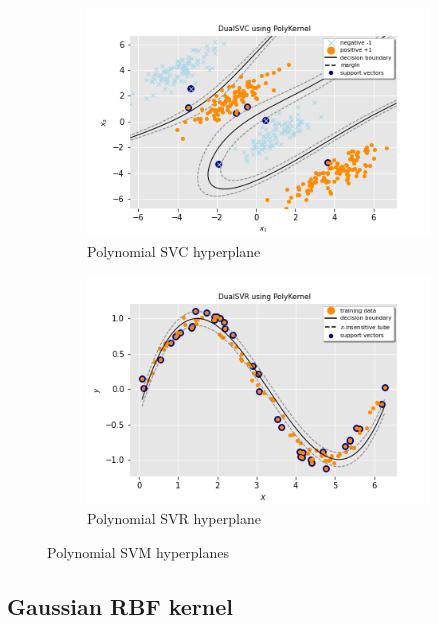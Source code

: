 \begin{figure}[h!]
	\centering
	\begin{subfigure}{.49\textwidth}
		\centering
		\includegraphics[width=\textwidth]{img/poly_dual_svc_hyperplane.png}
		\caption{Polynomial SVC hyperplane}
		\label{fig:poly_dual_svc_hyperplane}
	\end{subfigure}
	\begin{subfigure}{.49\textwidth}
		\centering
		\captionsetup{justification=centering}
		\includegraphics[width=\textwidth]{img/poly_dual_svr_hyperplane.png}
		\caption{Polynomial SVR hyperplane}
		\label{fig:poly_dual_svr_hyperplane}
	\end{subfigure}
\caption{Polynomial SVM hyperplanes}
\end{figure}

\subsection{Gaussian RBF kernel}

